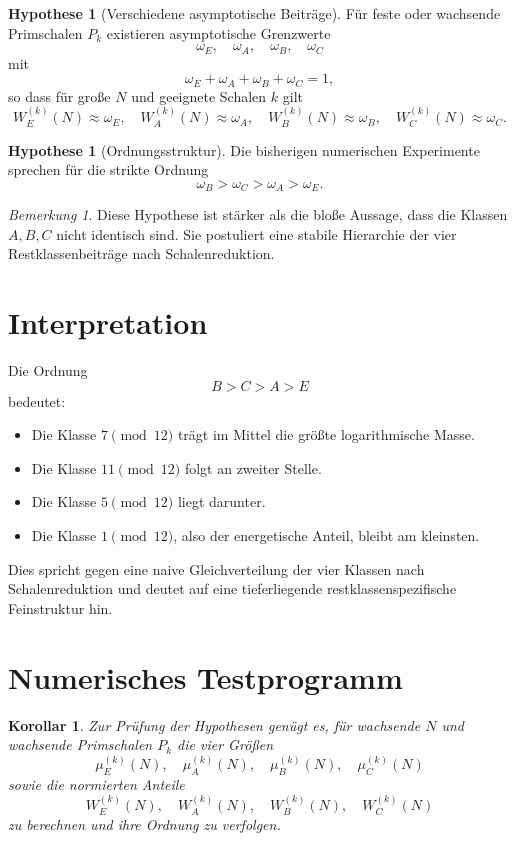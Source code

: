 \documentclass[11pt,a4paper]{article}
\newtheorem{korollar}[satz]{Korollar}
\theoremstyle{definition}
\newtheorem{hypothese}[satz]{Hypothese}
\theoremstyle{remark}
\newtheorem{bemerkung}[satz]{Bemerkung}
\begin{document}
	\begin{hypothese}[Verschiedene asymptotische Beiträge]
		Für feste oder wachsende Primschalen \(P_k\) existieren asymptotische Grenzwerte
		\[
		\omega_E,\quad \omega_A,\quad \omega_B,\quad \omega_C
		\]
		mit
		\[
		\omega_E+\omega_A+\omega_B+\omega_C=1,
		\]
		so dass für große \(N\) und geeignete Schalen \(k\) gilt
		\[
		W_E^{(k)}(N)\approx \omega_E,\quad
		W_A^{(k)}(N)\approx \omega_A,\quad
		W_B^{(k)}(N)\approx \omega_B,\quad
		W_C^{(k)}(N)\approx \omega_C.
		\]
	\end{hypothese}
	
	\begin{hypothese}[Ordnungsstruktur]
		Die bisherigen numerischen Experimente sprechen für die strikte Ordnung
		\[
		\omega_B>\omega_C>\omega_A>\omega_E.
		\]
	\end{hypothese}
	
	\begin{bemerkung}
		Diese Hypothese ist stärker als die bloße Aussage, dass die Klassen \(A,B,C\) nicht identisch
		sind. Sie postuliert eine stabile Hierarchie der vier Restklassenbeiträge nach Schalenreduktion.
	\end{bemerkung}
	
	\section{Interpretation}
	
	Die Ordnung
	\[
	B>C>A>E
	\]
	bedeutet:
	\begin{itemize}
		\item Die Klasse \(7 \pmod{12}\) trägt im Mittel die größte logarithmische Masse.
		\item Die Klasse \(11 \pmod{12}\) folgt an zweiter Stelle.
		\item Die Klasse \(5 \pmod{12}\) liegt darunter.
		\item Die Klasse \(1 \pmod{12}\), also der energetische Anteil, bleibt am kleinsten.
	\end{itemize}
	
	Dies spricht gegen eine naive Gleichverteilung der vier Klassen nach Schalenreduktion und
	deutet auf eine tieferliegende restklassenspezifische Feinstruktur hin.
	
	\section{Numerisches Testprogramm}
	
	\begin{korollar}
		Zur Prüfung der Hypothesen genügt es, für wachsende \(N\) und wachsende Primschalen \(P_k\)
		die vier Größen
		\[
		\mu_E^{(k)}(N),\quad \mu_A^{(k)}(N),\quad \mu_B^{(k)}(N),\quad \mu_C^{(k)}(N)
		\]
		sowie die normierten Anteile
		\[
		W_E^{(k)}(N),\quad W_A^{(k)}(N),\quad W_B^{(k)}(N),\quad W_C^{(k)}(N)
		\]
		zu berechnen und ihre Ordnung zu verfolgen.
	\end{korollar}
	
\end{document}
